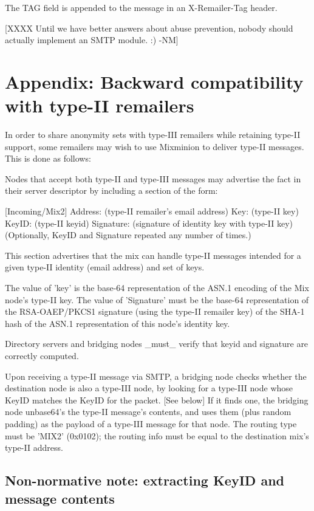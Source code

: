 The TAG field is appended to the message in an X-Remailer-Tag header.

[XXXX Until we have better answers about abuse prevention, nobody should
  actually implement an SMTP module. :) -NM]

\section{Appendix: Backward compatibility with type-II remailers}

In order to share anonymity sets with type-III remailers while
retaining type-II support, some remailers may wish to use Mixminion to
deliver type-II messages.  This is done as follows:

Nodes that accept both type-II and type-III messages may advertise the
fact in their server descriptor by including a section of the form:
 
         [Incoming/Mix2]
         Address: (type-II remailer's email address)
         Key: (type-II key)
	 KeyID: (type-II keyid)
         Signature: (signature of identity key with type-II key)
	 (Optionally, KeyID and Signature repeated any number of
                      times.)

This section advertises that the mix can handle type-II messages
intended for a given type-II identity (email address) and set of keys.

The value of 'key' is the base-64 representation of the ASN.1 encoding
of the Mix node's type-II key. The value of 'Signature' must be the
base-64 representation of the RSA-OAEP/PKCS1 signature (using the
type-II remailer key) of the SHA-1 hash of the ASN.1 representation of
this node's identity key.

Directory servers and bridging nodes _must_ verify that keyid and
signature are correctly computed.

Upon receiving a type-II message via SMTP, a bridging node checks
whether the destination node is also a type-III node, by looking for a
type-III node whose KeyID matches the KeyID for the packet. [See below]
If it finds one, the bridging node unbase64's the type-II message's 
contents, and uses them (plus random padding) as the payload
of a type-III message for that node.  The routing type must be 'MIX2'
(0x0102); the routing info must be equal to the destination mix's
type-II address.

\subsection{Non-normative note: extracting KeyID and message contents}

